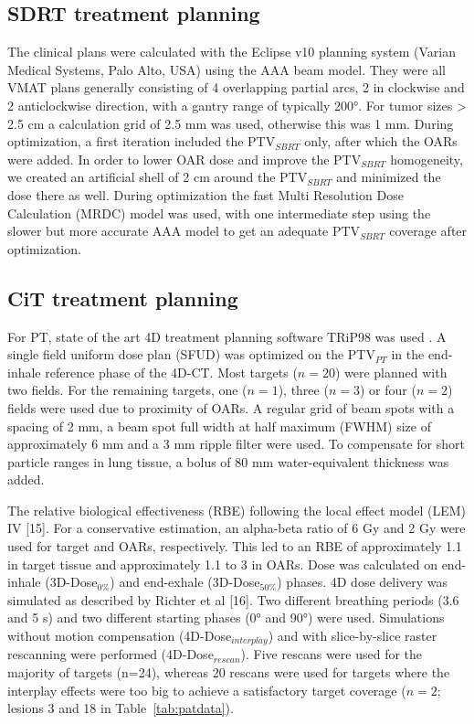 \documentclass[type=dr, dr=rernat, acm$^3$entcolor=tud7b,colorbacktitle, bigchapter, openright, twoside, 12pt ]{tudthesis}
\begin{document}
\subsection{SDRT treatment planning}
\label{SBRTTP}

The clinical plans were calculated with the Eclipse v10 planning system (Varian Medical Systems, Palo Alto, USA) using the AAA beam model. They were all VMAT plans generally consisting of 4 overlapping partial arcs, 2 in clockwise and 2 anticlockwise direction, with a gantry range of typically 200°. For tumor sizes > 2.5 cm a calculation grid of 2.5 mm was used, otherwise this was 1 mm. During optimization, a first iteration included the PTV$_{SBRT}$ only, after which the OARs were added. In order to lower OAR dose and improve the PTV$_{SBRT}$ homogeneity, we created an artificial shell of 2 cm around the PTV$_{SBRT}$ and minimized the dose there as well. During optimization the fast Multi Resolution Dose Calculation (MRDC) model was used, with one intermediate step using the slower but more accurate AAA model to get an adequate PTV$_{SBRT}$ coverage after optimization.


\subsection{CiT treatment planning}
\label{CiTTP}

For PT, state of the art 4D treatment planning software TRiP98 was used \cite{Richter2013}. A single field uniform dose plan (SFUD) was optimized on the PTV$_{PT}$ in the end-inhale reference phase of the 4D-CT. Most targets ($n=20$) were planned with two fields. For the remaining targets, one ($n=1$), three ($n=3$) or four ($n=2$) fields were used due to proximity of OARs. A regular grid of beam spots with a spacing of 2 mm, a beam spot full width at half maximum (FWHM) size of approximately 6 mm and a 3 mm ripple filter were used. To compensate for short particle ranges in lung tissue, a bolus of 80 mm water-equivalent thickness was added.

The relative biological effectiveness (RBE) following the local effect model (LEM) IV [15]. For a conservative estimation, an alpha-beta ratio of 6 Gy and 2 Gy were used for target and OARs, respectively. This led to an RBE of approximately 1.1 in target tissue and approximately 1.1 to 3 in OARs.
Dose was calculated on end-inhale (3D-Dose$_{0\%}$) and end-exhale (3D-Dose$_{50\%}$) phases. 4D dose delivery was simulated as described by Richter et al [16]. Two different breathing periods (3.6 and 5 s) and two different starting phases (0° and 90°) were used. Simulations without motion compensation (4D-Dose$_{interplay}$) and with slice-by-slice raster rescanning were performed (4D-Dose$_{rescan}$). Five rescans were used for the majority of targets (n=24), whereas 20 rescans were used for targets where the interplay effects were too big to achieve a satisfactory target coverage ($n=2$; lesions 3 and 18 in Table~\ref{tab:patdata}). 
\end{document}
